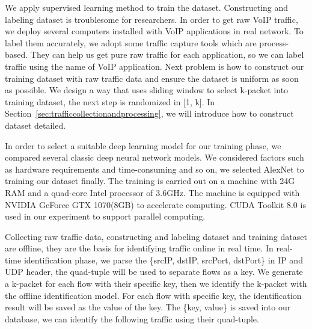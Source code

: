 \documentclass[conference]{IEEEtran}
\begin{document}
We apply supervised learning method to train the dataset. Constructing and labeling dataset is troublesome for researchers. In order to get raw VoIP traffic, we deploy several computers installed with VoIP applications in real network. To label them accurately, we adopt some traffic capture tools which are process-based. They can help us get pure raw traffic for each application, so we can label traffic using the name of VoIP application. Next problem is how to construct our training dataset with raw traffic data and ensure the dataset is uniform as soon as possible. We design a way that uses sliding window to select k-packet into training dataset, the next step is randomized in [1, k]. In Section~\ref{sec:trafficcollectionandprocessing}, we will introduce how to construct dataset detailed.

In order to select a suitable deep learning model for our training phase, we compared several classic deep neural network models. We considered factors such as hardware requirements and time-consuming and so on, we selected AlexNet to training our dataset finally. The training is carried out on a machine with 24G RAM and a quad-core Intel processor of 3.6GHz. The machine is equipped with NVIDIA GeForce GTX 1070(8GB) to accelerate computing. CUDA Toolkit 8.0 is used in our experiment to support parallel computing.

Collecting raw traffic data, constructing and labeling dataset and training dataset are offline, they are the basis for identifying traffic online in real time. In real-time identification phase, we parse the \{srcIP, dstIP, srcPort, dstPort\} in IP and UDP header, the quad-tuple will be used to separate flows as a key. We generate a k-packet for each flow with their specific key, then we identify the k-packet with the offline identification model. For each flow with specific key, the identification result will be saved as the value of the key. The \{key, value\} is saved into our database, we can identify the following traffic using their quad-tuple.
\end{document}
